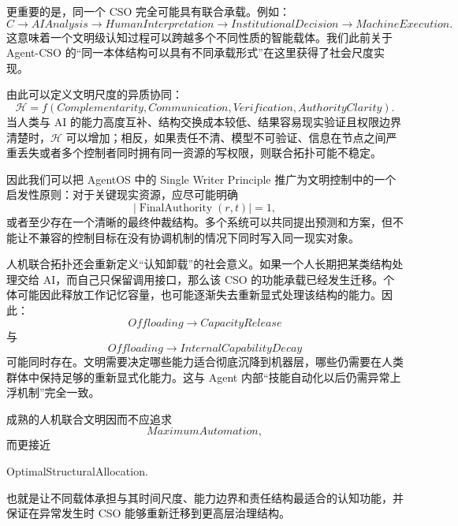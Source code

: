 更重要的是，同一个 CSO 完全可能具有联合承载。例如：
\begin{equation}
C
\rightarrow
AIAnalysis
\rightarrow
HumanInterpretation
\rightarrow
InstitutionalDecision
\rightarrow
MachineExecution.
\end{equation}
这意味着一个文明级认知过程可以跨越多个不同性质的智能载体。我们此前关于 Agent-CSO 的“同一本体结构可以具有不同承载形式”在这里获得了社会尺度实现。

由此可以定义文明尺度的异质协同：
\begin{equation}
\mathcal{H}
=
f
\left(
Complementarity,
Communication,
Verification,
AuthorityClarity
\right).
\end{equation}
当人类与 AI 的能力高度互补、结构交换成本较低、结果容易现实验证且权限边界清楚时，$\mathcal{H}$ 可以增加；相反，如果责任不清、模型不可验证、信息在节点之间严重丢失或者多个控制者同时拥有同一资源的写权限，则联合拓扑可能不稳定。

因此我们可以把 AgentOS 中的 Single Writer Principle 推广为文明控制中的一个启发性原则：对于关键现实资源，应尽可能明确
\begin{equation}
|\operatorname{FinalAuthority}(r,t)|
=
1,
\end{equation}
或者至少存在一个清晰的最终仲裁结构。多个系统可以共同提出预测和方案，但不能让不兼容的控制目标在没有协调机制的情况下同时写入同一现实对象。

人机联合拓扑还会重新定义“认知卸载”的社会意义。如果一个人长期把某类结构处理交给 AI，而自己只保留调用接口，那么该 CSO 的功能承载已经发生迁移。个体可能因此释放工作记忆容量，也可能逐渐失去重新显式处理该结构的能力。因此：
\begin{equation}
Offloading
\rightarrow
CapacityRelease
\end{equation}
与
\begin{equation}
Offloading
\rightarrow
InternalCapabilityDecay
\end{equation}
可能同时存在。文明需要决定哪些能力适合彻底沉降到机器层，哪些仍需要在人类群体中保持足够的重新显式化能力。这与 Agent 内部“技能自动化以后仍需异常上浮机制”完全一致。

成熟的人机联合文明因而不应追求
\begin{equation}
MaximumAutomation,
\end{equation}
而更接近
\begin{statementbox}
OptimalStructuralAllocation.
\end{statementbox}
也就是让不同载体承担与其时间尺度、能力边界和责任结构最适合的认知功能，并保证在异常发生时 CSO 能够重新迁移到更高层治理结构。

